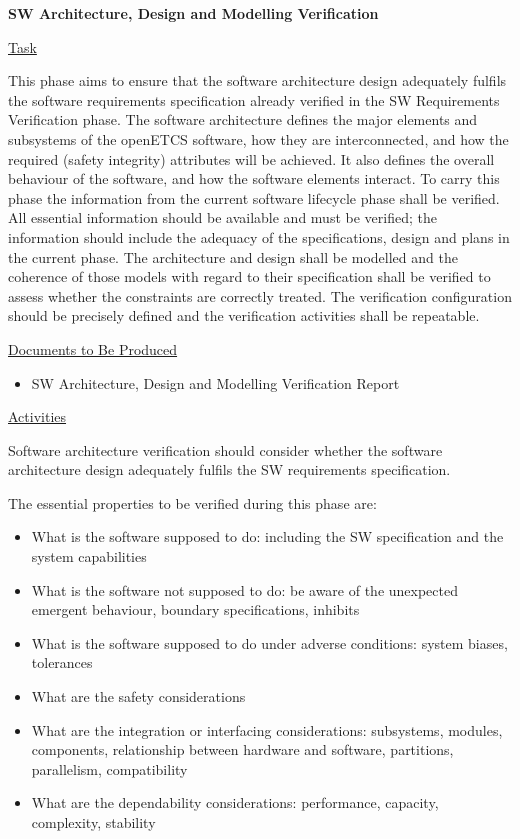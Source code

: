 \textbf{SW Architecture, Design and Modelling Verification}

\underline{Task} 

This phase aims to ensure that the software architecture design
adequately fulfils the software requirements specification already
verified in the SW Requirements Verification phase. 
The software architecture defines the major elements and subsystems of
the openETCS software, how they are interconnected, and how the
required (safety integrity) attributes will be achieved. It also
defines the overall behaviour of the software, and how the software
elements interact.  
To carry this phase the information from the current software
lifecycle phase shall be verified. All essential information should be
available and must be verified; the information should include the
adequacy of the specifications, design and plans in the current phase.  
The architecture and design shall be modelled and the coherence of
those models with regard to their specification shall be verified to
assess whether the constraints are correctly treated. 
The verification configuration should be precisely defined and the
verification activities shall be repeatable. 

\underline{Documents to Be Produced} 

\begin{itemize}
\item SW Architecture, Design and Modelling Verification Report
\end{itemize}

\underline{Activities}

Software architecture verification should consider whether the
software architecture design adequately fulfils the SW requirements
specification.  

The essential properties to be verified during this phase are:

\begin{itemize}
\item What is the software supposed to do: including the SW
  specification and the system capabilities
\item What is the software not supposed to do: be aware of the
  unexpected emergent behaviour, boundary specifications, inhibits
\item What is the software supposed to do under adverse conditions:
  system biases, tolerances
\item What are the safety considerations
\item What are the integration or interfacing considerations:
  subsystems, modules, components, relationship between hardware and
  software, partitions, parallelism, compatibility 
\item What are the dependability considerations: performance,
  capacity, complexity, stability
\end{itemize}

